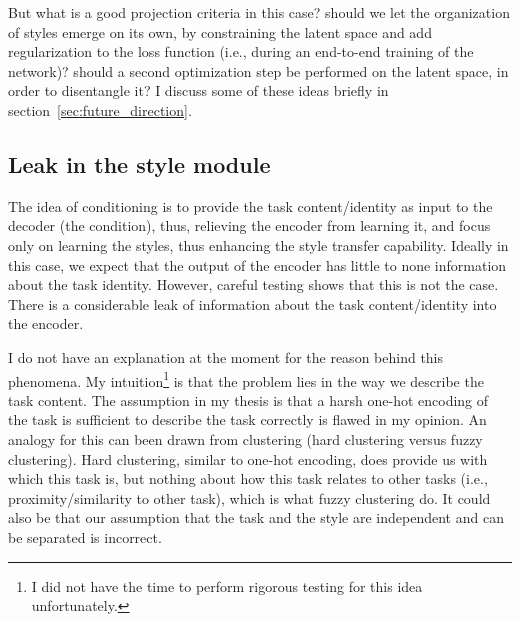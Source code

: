     But what is a good projection criteria in this case? should we let the organization of styles emerge on its own, by constraining the latent space and add regularization to the loss function (i.e., during an end-to-end training of the network)? should a second optimization step be performed on the latent space, in order to disentangle it? I discuss some of these ideas briefly in section~\ref{sec:future_direction}.

  \subsection{Leak in the style module}

    \par The idea of conditioning is to provide the task content/identity as input to the decoder (the condition), thus, relieving the encoder from learning it, and focus only on learning the styles, thus enhancing the style transfer capability. Ideally in this case, we expect that the output of the encoder has little to none information about the task identity. However, careful testing shows that this is not the case. There is a considerable leak of information about the task content/identity into the encoder.


    \par I do not have an explanation at the moment for the reason behind this phenomena. My intuition\footnote{I did not have the time to perform rigorous testing for this idea unfortunately.} is that the problem lies in the way we describe the task content. The assumption in my thesis is that a harsh one-hot encoding of the task is sufficient to describe the task correctly is flawed in my opinion. An analogy for this can been drawn from clustering (hard clustering versus fuzzy clustering). Hard clustering, similar to one-hot encoding, does provide us with which this task is, but nothing about how this task relates to other tasks (i.e., proximity/similarity to other task), which is what fuzzy clustering do. It could also be that our assumption that the task and the style are independent and can be separated is incorrect.

